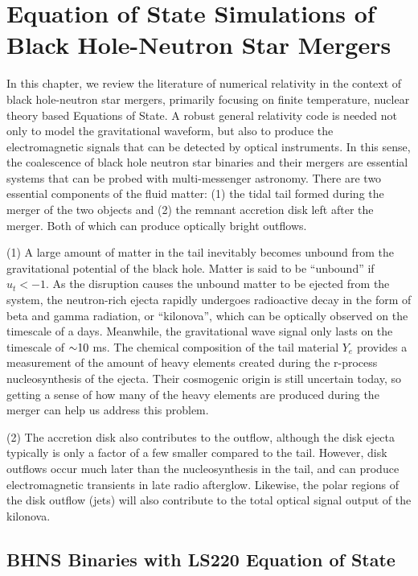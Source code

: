 \chapter{Equation of State Simulations of Black Hole-Neutron Star Mergers}
\label{chap:chapter-4}

In this chapter, we review the literature of numerical relativity in the context of black hole-neutron star mergers, primarily focusing on finite temperature, nuclear theory based Equations of State.  A robust general relativity code is needed not only to model the gravitational waveform, but also to produce the electromagnetic signals that can be detected by optical instruments.  In this sense, the coalescence of black hole neutron star binaries and their mergers are essential systems that can be probed with multi-messenger astronomy.   There are two essential components of the fluid matter: (1) the tidal tail formed during the merger of the two objects and (2) the remnant accretion disk left after the merger.  Both of which can produce optically bright outflows.

(1) A large amount of matter in the tail inevitably becomes unbound from the gravitational potential of the black hole.  Matter is said to be ``unbound'' if $u_t < -1$.  
As the disruption causes the unbound matter to be ejected from the system, the neutron-rich ejecta rapidly undergoes radioactive decay in the form of beta and gamma radiation, or ``kilonova'', which can be optically observed on the timescale of a days.
Meanwhile, the gravitational wave signal only lasts on the timescale of $\mathord{\sim}10$ ms.
The chemical composition of the tail material $Y_e$ provides a measurement of the amount of heavy elements created during the r-process nucleosynthesis of the ejecta.  
Their cosmogenic origin is still uncertain today, so getting a sense of how many of the heavy elements are produced during the merger can help us address this problem.
  
(2)  The accretion disk also contributes to the outflow, although the disk ejecta typically is only a factor of a few smaller compared to the tail.
However, disk outflows occur much later than the nucleosynthesis in the tail, and can produce electromagnetic transients in late radio afterglow.
Likewise, the polar regions of the disk outflow (jets) will also contribute to the total optical signal output of the kilonova.




\section{BHNS Binaries with LS220 Equation of State}

